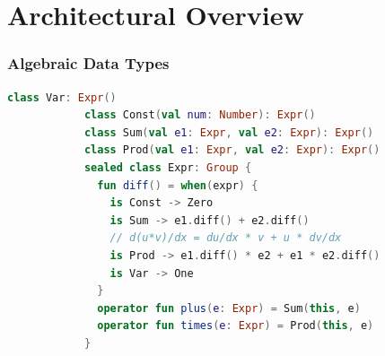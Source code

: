 \documentclass{beamer}
\begin{document}


    \section{Architectural Overview}\label{sec:third-section}

    \begin{frame}[fragile]
        \frametitle{Algebraic Data Types}
        \begin{lstlisting}[language=Kotlin, gobble=12]
            class Var: Expr()
            class Const(val num: Number): Expr()
            class Sum(val e1: Expr, val e2: Expr): Expr()
            class Prod(val e1: Expr, val e2: Expr): Expr()
            sealed class Expr: Group {
              fun diff() = when(expr) {
                is Const -> Zero
                is Sum -> e1.diff() + e2.diff()
                // d(u*v)/dx = du/dx * v + u * dv/dx
                is Prod -> e1.diff() * e2 + e1 * e2.diff()
                is Var -> One
              }
              operator fun plus(e: Expr) = Sum(this, e)
              operator fun times(e: Expr) = Prod(this, e)
            }
        \end{lstlisting}
    \end{frame}
\end{document}
